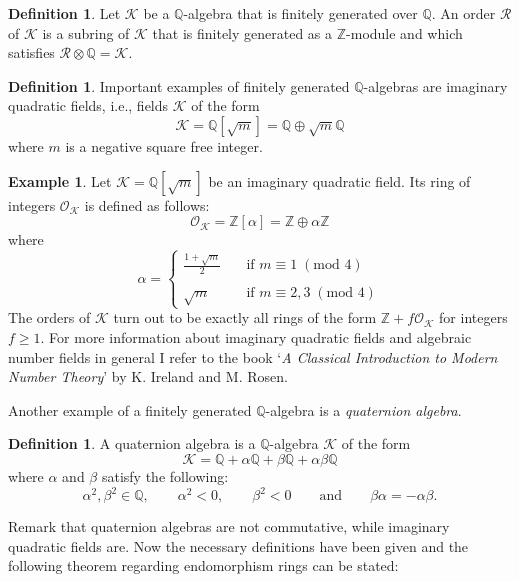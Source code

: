 \documentclass{article}
\numberwithin{equation}{section}
\theoremstyle{definition}
\newtheorem{definition}[theorem]{Definition}
\newtheorem{example}[theorem]{Example}
\newcommand{\QQ}{{\mathbb Q}} %
\newcommand{\ZZ}{{\mathbb Z}} %
\begin{document}
\begin{definition}
Let $\mathcal{K}$ be a $\QQ$-algebra that is finitely generated over $\QQ$. An order $\mathcal{R}$ of $\mathcal{K}$ is a subring of $\mathcal{K}$ that is finitely generated as a $\ZZ$-module and which satisfies $\mathcal{R} \otimes \QQ = \mathcal{K}$.
\end{definition}

\begin{definition}
Important examples of finitely generated $\QQ$-algebras are imaginary quadratic fields, i.e., fields $\mathcal{K}$ of the form $$\mathcal{K}=\QQ[\sqrt{m}]=\QQ \oplus \sqrt{m} \QQ$$ where $m$ is a negative square free integer. 
\end{definition}

\begin{example}
Let $\mathcal{K}=\QQ[\sqrt{m}]$ be an imaginary quadratic field. Its ring of integers $\mathcal{O}_\mathcal{K}$ is defined as follows:$$\mathcal{O}_\mathcal{K}=\ZZ[\alpha]=\ZZ \oplus \alpha \ZZ$$ where $$\alpha = \left \{ \begin{array}{ll} \frac{1+\sqrt{m}}{2} \quad &\text{if } m \equiv 1 \; (\text{mod } 4) \\ \\ \sqrt{m} &\text{if } m \equiv 2,3 \; (\text{mod } 4)  \end{array} \right .$$ The orders of $\mathcal{K}$ turn out to be exactly all rings of the form $\ZZ + f \mathcal{O}_\mathcal{K}$ for integers $f \geq 1$. For more information about imaginary quadratic fields and algebraic number fields in general I refer to the book `\emph{A Classical Introduction to Modern Number Theory}' by K. Ireland and M. Rosen. \cite{Ireland}
\end{example}

Another example of a finitely generated $\QQ$-algebra is a \emph{quaternion algebra}. 

\begin{definition}
A quaternion algebra is a $\QQ$-algebra $\mathcal{K}$ of the form $$\mathcal{K}=\QQ+\alpha\QQ+\beta\QQ+\alpha\beta\QQ$$ where $\alpha$ and $\beta$ satisfy the following: $$\alpha^2,\beta^2 \in \QQ, \qquad \alpha^2<0, \qquad \beta^2 <0 \qquad \text{and} \qquad \beta\alpha=-\alpha\beta.$$
\end{definition}

Remark that quaternion algebras are not commutative, while imaginary quadratic fields are. Now the necessary definitions have been given and the following theorem regarding endomorphism rings can be stated:
\end{document}
